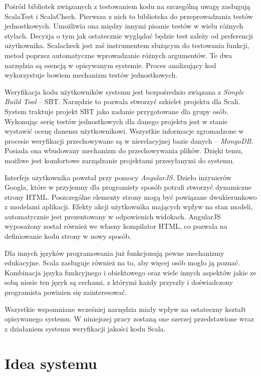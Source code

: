 \documentclass[brudnopis]{xmgr}
\begin{document}
Pośród bibliotek związanych z testowaniem kodu na szczególną uwagę zasługują ScalaTest i ScalaCheck. Pierwsza z nich to biblioteka do przeprowadzania testów jednostkowych. Umożliwia ona między innymi pisanie testów w wielu różnych stylach. Decyzja o tym jak ostatecznie wyglądać będzie test zależy od preferencji użytkownika. Scalacheck jest zaś instrumentem służącym do testowania funkcji, metod poprzez automatyczne wprowadzanie różnych argumentów. Te dwa narzędzia są esencją w opisywanym systemie. Proces analizujący kod wykorzystuje bowiem mechanizm testów jednostkowych.  

Weryfikacja kodu użytkowników systemu jest bezpośrednio związana z \emph{Simple Build Tool} -- SBT. Narzędzie to pozwala stworzyć szkielet projektu dla Scali. System traktuje projekt SBT jako zadanie przygotowane dla grupy osób. Wykonując serię testów jednostkowych dla danego projektu jest w stanie wystawić ocenę danemu użytkownikowi. Wszystkie informacje zgromadzone w procesie weryfikacji przechowywane są w nierelacyjnej bazie danych -- \emph{MongoDB}. Posiada ona wbudowany mechanizm do przechowywania plików. Dzięki temu, możliwe jest komfortowe zarządzanie projektami przesyłanymi do systemu.

Interfejs użytkownika powstał przy pomocy \emph{AngularJS}. Dzieło inżynierów Googla, które w przyjemny dla programisty sposób potrafi stworzyć dynamiczne strony HTML. Poszczególne elementy strony mogą być powiązane dwukierunkowo z modelami aplikacji. Efekty akcji użytkownika mających wpływ na stan modeli, automatycznie jest prezentowany w odpowienich widokach. AngularJS wyposażony został również we własny kompilator HTML, co pozwala na definiowanie kodu strony w nowy sposób.  

Dla innych języków programowania już funkcjonują pewne mechanizmy edukacyjne. Scala zasługuje również na to, aby więcej osób mogło ją poznać. Kombinacja języka funkcyjnego i obiektowego oraz wiele innych aspektów jakie ze sobą niesie ten język są cechami, z którymi każdy przyszły i doświadczony programista powinien się zainteresować. 

Wszystkie wspomniane wcześniej narzędzia miały wpływ na ostateczny kształt opisywanego systemu. W niniejszej pracy zostaną one szerzej przedstawione wraz z działaniem systemu weryfikacji jakości kodu Scala.

\chapter{Idea systemu}
\end{document}
